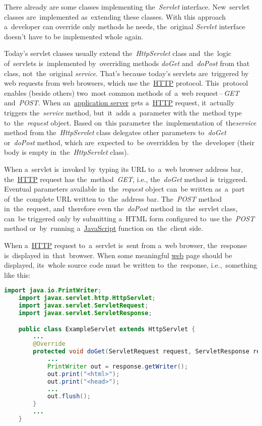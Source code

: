 There already are some classes implementing the~\textit{Servlet} interface.
New~servlet classes are~implemented as~extending these classes.
With this approach a~developer can override only methods he needs, the~original \textit{Servlet} interface doesn't have to be implemented whole again.

 Today's servlet classes usually extend the~\textit{HttpServlet} class and~the~logic of~servlets is~implemented by~overriding methods \textit{doGet} and~\textit{doPost} from that class, not~the~original \textit{service}.
That's because today's servlets are~triggered by web requests from web browsers, which use the~\hyperref[http]{HTTP} protocol.
This~protocol enables (beside others) two~most common methods of~a~web request\,--\,\textit{GET} and~\textit{POST}.
When an~\hyperref[applicationserver]{application server} gets a~\hyperref[http]{HTTP} request, it~actually triggers the~\textit{service} method, but~it~adds a~parameter with the~method type to~the~\textit{request} object.
Based on~this parameter the~implementation of~the\textit{service} method from the~\textit{HttpServlet} class delegates other parameters to~\textit{doGet} or~\textit{doPost} method, which are~expected to~be overridden by~the~developer (their body is empty in~the~\textit{HttpServlet} class).

When a~servlet is~invoked by~typing its URL to~a~web browser address bar, the~\hyperref[http]{HTTP} request has the~method~\textit{GET}, i.e., the~\textit{doGet} method is~triggered.
Eventual parameters available in~the~\textit{request} object can~be written as~a~part of~the~complete URL written to~the~address bar.
The~\textit{POST} method in~the~request, and~therefore even the~\textit{doPost} method in~the~servlet class, can~be triggered only by submitting a~HTML form configured to~use the~\textit{POST} method or~by~running a~\hyperref[javascript]{JavaScript} function on~the~client side.


\label{jsp}
When a~\hyperref[http]{HTTP} request to~a~servlet is~sent from a~web browser, the~response is~displayed in~that~browser.
When some meaningful \hyperref[internetweb]{web} page should be displayed, its~whole source code must be written to~the~response, i.e.,~something like this:

\begin{lstlisting}[language=Java]
    import java.io.PrintWriter;
    import javax.servlet.http.HttpServlet;
    import javax.servlet.ServletRequest;
    import javax.servlet.ServletResponse;

    public class ExampleServlet extends HttpServlet {
        ...
        @Override
        protected void doGet(ServletRequest request, ServletResponse response) {
            ...
            PrintWriter out = response.getWriter();
            out.print("<html>");
            out.print("<head>");
            ...
            out.flush();
        }
        ...
    }
\end{lstlisting}


